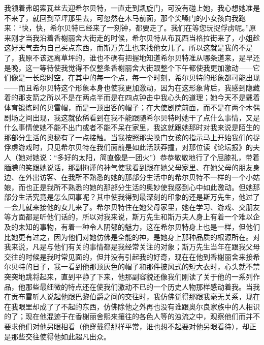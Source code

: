 \par 我领着弗朗索瓦丝去迎希尔贝特，一直走到凯旋门，可没有碰上她，我心想她准是不来了，就回到草坪那里去，可忽然在木马前面，那个尖嗓门的小女孩向我跑来：“快，快，希尔贝特已经来了一刻钟，都要走了。我们在等您玩捉俘虏呢。”原来刚才当我沿着香榭丽舍大街走的时候，希尔贝特从布瓦西当格拉街来了，小姐趁这好天气去为自己买点东西，而斯万先生也来找他女儿了。所以这就是我的不是了，我原不该远离草坪的，谁也不确有把握地知道希尔贝特准从哪条道来，是早还是晚，这一等待使我觉得不仅整条香榭丽舍大街跟整个下午都使我更加激动——它们像是一长段时空，在其中的每一个点，每一个时刻，希尔贝特的形象都可能出现——而且希尔贝特这个形象本身也使我更加激动，因为在这形象背后，我感到隐藏着的那支箭之所以不是在两点半而是在四点钟击中我心头的道理；她今天不是戴着体育锻炼时的贝雷帽，而是一顶出客的帽子；在大使剧院前面，而不是在两个木偶剧场之间出现，我这就依稀看到在我不能跟随希尔贝特时她干了点什么事情，又是什么事情使她不能不出门或者不能不呆在家里，我这就跟她那时对我来说是陌生的那部分生活的奥秘有了一点接触。当我按照那尖嗓门女孩的指示马上开始我们的捉俘虏游戏时，只见希尔贝特在我们面前是如此活跃莽撞，对那位读《论坛报》的夫人（她对她说：“多好的太阳，简直像是一团火”）恭恭敬敬地行了个屈膝礼，带着腼腆的笑跟她说话，那副拘谨的神气使我看到跟在她父母家里、在她父母的朋友身边、在外出访客、在我所不熟悉的她的那部分生活中的希尔贝特不一样的一个小姑娘，而也正是我所不熟悉的她的那部分生活的奥妙使我感到心中如此激动。但她那部分生活究竟是怎么回事呢？其中使我得到最深刻的印象的还是斯万先生，他过了一会儿就来接他的女儿来了。希尔贝特住在她父母家里，她在学习、游戏、交朋友等方面都是听他们话的，所以对我来说，斯万先生和斯万夫人身上有着一个难以企及的未知的事物，有着一种令人阴郁的魅力，这在希尔贝特身上也是一样，但他们比她更有过之，因为他们对她仿佛是全能的神，是她身上那种品质的根源所在。对我来说，凡是与他们有关的事情都是我经常关注的对象；斯万先生当年在跟我父母交往的时候是我时常见面的，但并没有引起我的好奇，现在在他到香榭丽舍来接希尔贝特的日子，我一看到他那顶灰色的帽子和那件披风式的短大衣时，心头就不禁突突地跳将起来，直到平静了下来，他那副容貌还像我们刚读了关于他的一系列作品，他那些最细微的特点还在使我们激动不已的一个历史人物那样感动着我。当我在贡布雷听人说起他跟巴黎伯爵之间的交往时，我仿佛觉得那跟我毫无关系，现在在我眼里却成了了不起的东西，仿佛除他之外再也没有谁跟奥尔良家族中的人相识的了；现在他混迹于在香榭丽舍熙来攘往的各色人等的浊流之中，观察他们而并不要求他们对他另眼相看（他穿戴得那样平常，谁也想不起要对他另眼看待），却正是那些交往使得他如此超凡出众。
